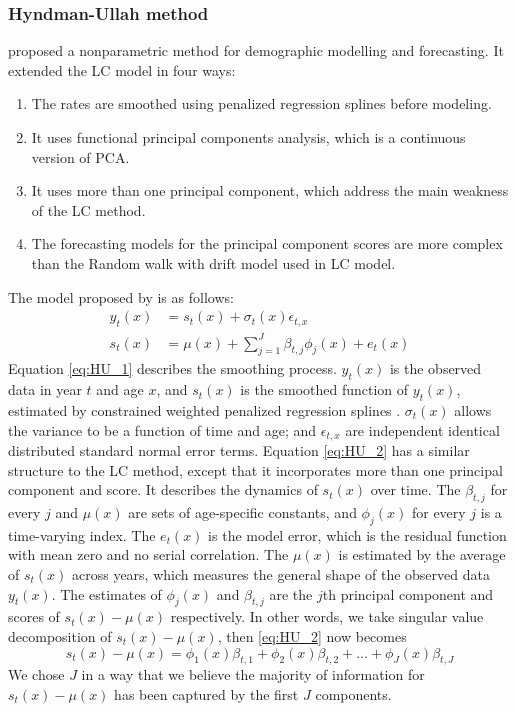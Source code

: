 \documentclass[11pt,a4paper,]{article}
\providecommand{\tightlist}{%
  \setlength{\itemsep}{0pt}\setlength{\parskip}{0pt}}
\begin{document}
\hypertarget{hyndman-ullah-method}{%
\subsubsection{\texorpdfstring{Hyndman-Ullah method \label{sec:HU}}{Hyndman-Ullah method }}\label{hyndman-ullah-method}}

\textcite{HU07} proposed a nonparametric method for demographic modelling and forecasting. It extended the LC model in four ways:

\begin{enumerate}
\def\labelenumi{\arabic{enumi}.}
\tightlist
\item
  The rates are smoothed using penalized regression splines \autocite{BHT14} before modeling.
\item
  It uses functional principal components analysis, which is a continuous version of PCA.
\item
  It uses more than one principal component, which address the main weakness of the LC method.
\item
  The forecasting models for the principal component scores are more complex than the Random walk with drift model used in LC model.
\end{enumerate}

The model proposed by \textcite{HU07} is as follows:
\begin{align}
  y_t(x) & = s_t(x) + \sigma_t(x)\epsilon_{t,x}\label{eq:HU_1}\\
  s_t(x) & = \mu(x) + \sum_{j=1}^{J}\beta_{t,j}\phi_j(x) + e_t(x)\label{eq:HU_2}
\end{align}
Equation \eqref{eq:HU_1} describes the smoothing process. \(y_t(x)\) is the observed data in year \(t\) and age \(x\), and \(s_t(x)\) is the smoothed function of \(y_t(x)\), estimated by constrained weighted penalized regression splines \autocite{BHT14}. \(\sigma_t(x)\) allows the variance to be a function of time and age; and \(\epsilon_{t,x}\) are independent identical distributed standard normal error terms. Equation \eqref{eq:HU_2} has a similar structure to the LC method, except that it incorporates more than one principal component and score. It describes the dynamics of \(s_t(x)\) over time. The \(\beta_{t,j}\) for every \(j\) and \(\mu(x)\) are sets of age-specific constants, and \(\phi_j(x)\) for every \(j\) is a time-varying index. The \(e_t(x)\) is the model error, which is the residual function with mean zero and no serial correlation. The \(\mu(x)\) is estimated by the average of \(s_t(x)\) across years, which measures the general shape of the observed data \(y_t(x)\). The estimates of \(\phi_j(x)\) and \(\beta_{t,j}\) are the \(j\)th principal component and scores of \(s_t(x)-\mu(x)\) respectively. In other words, we take singular value decomposition of \(s_t(x)-\mu(x)\), then \eqref{eq:HU_2} now becomes
\[
  s_t(x)-\mu(x) = \phi_1(x)\beta_{t,1}+\phi_2(x)\beta_{t,2}+\dots+\phi_J(x)\beta_{t,J}
\]
We chose \(J\) in a way that we believe the majority of information for \(s_t(x)-\mu(x)\) has been captured by the first \(J\) components.
\end{document}
